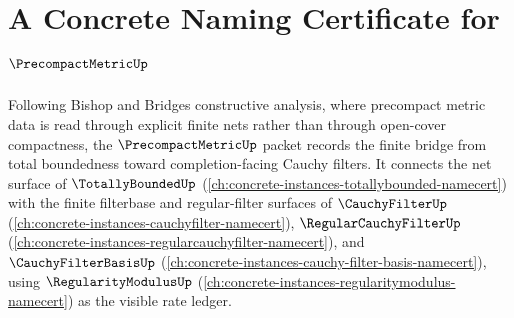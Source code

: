 \chapter{A Concrete Naming Certificate for $\PrecompactMetricUp$}
\label{ch:concrete-instances-precompactmetric-namecert}

Following Bishop and Bridges constructive analysis, where precompact metric
data is read through explicit finite nets rather than through open-cover
compactness, the $\PrecompactMetricUp$ packet records the finite bridge from
total boundedness toward completion-facing Cauchy filters. It connects the
net surface of $\TotallyBoundedUp$
(\autoref{ch:concrete-instances-totallybounded-namecert}) with the finite
filterbase and regular-filter surfaces of $\CauchyFilterUp$
(\autoref{ch:concrete-instances-cauchyfilter-namecert}),
$\RegularCauchyFilterUp$
(\autoref{ch:concrete-instances-regularcauchyfilter-namecert}), and
$\CauchyFilterBasisUp$
(\autoref{ch:concrete-instances-cauchy-filter-basis-namecert}), using
$\RegularityModulusUp$
(\autoref{ch:concrete-instances-regularitymodulus-namecert}) as the visible
rate ledger.

